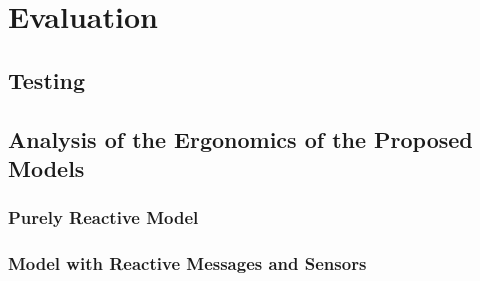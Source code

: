 
\chapter{Evaluation}
\label{chap:evaluation}

\section{Testing}

\section{Analysis of the Ergonomics of the Proposed Models}





\subsection{Purely Reactive Model}



\subsection{Model with Reactive Messages and Sensors}


